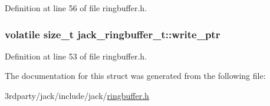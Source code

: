 \-Definition at line 56 of file ringbuffer.\-h.

\hypertarget{structjack__ringbuffer__t_a7ba69e5aa3fdde2f4e4421e50c10b737}{
\subsubsection[{write\-\_\-ptr}]{\setlength{\rightskip}{0pt plus 5cm}volatile size\-\_\-t {\bf jack\-\_\-ringbuffer\-\_\-t\-::write\-\_\-ptr}}}\label{df/d9b/structjack__ringbuffer__t_a7ba69e5aa3fdde2f4e4421e50c10b737}


\-Definition at line 53 of file ringbuffer.\-h.



\-The documentation for this struct was generated from the following file\-:\begin{DoxyCompactItemize}
\item 
3rdparty/jack/include/jack/\hyperlink{ringbuffer_8h}{ringbuffer.\-h}\end{DoxyCompactItemize}
